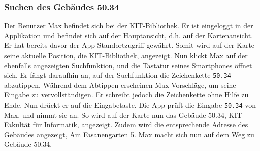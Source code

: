 \subsubsection{Suchen des Gebäudes 50.34}

Der Benutzer Max befindet sich bei der KIT-Bibliothek. Er ist eingeloggt in der Applikation und befindet sich auf der Hauptansicht, d.h. auf der Kartenansicht. Er hat bereits davor der App Standortzugriff gewährt. Somit wird auf der Karte seine aktuelle Position, die KIT-Bibliothek, angezeigt.
Nun klickt Max auf der ebenfalls angezeigten Suchfunktion, und die Tastatur seines Smartphones öffnet sich.
Er fängt daraufhin an, auf der Suchfunktion die Zeichenkette \texttt{50.34} abzutippen. Während dem Abtippen erscheinen Max Vorschläge, um seine Eingabe zu vervollständigen. Er schreibt jedoch die Zeichenkette ohne Hilfe zu Ende. Nun drückt er auf die Eingabetaste. Die App prüft die Eingabe \texttt{50.34} von Max, und nimmt sie an. So wird auf der Karte nun das Gebäude 50.34, KIT Fakultät für Informatik, angezeigt. Zudem wird die entsprechende Adresse des Gebäudes angezeigt, Am Fasanengarten 5. Max macht sich nun auf dem Weg zu Gebäude 50.34.
